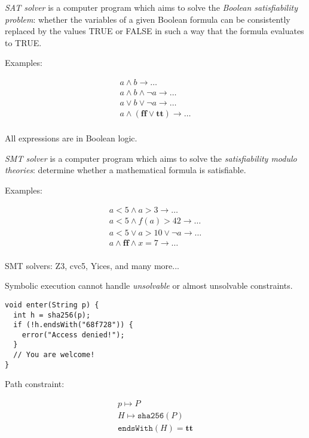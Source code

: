 \documentclass{article}
\begin{document}
\plush{}



\emph{SAT solver} is a computer program which aims to solve the \emph{Boolean satisfiability problem}: whether the variables of a given Boolean formula can be consistently replaced by the values TRUE or FALSE in such a way that the formula evaluates to TRUE.

Examples:

\begin{equation*}
\begin{split}
a \wedge b \to \dots \\
a \wedge b \wedge \neg a \to \dots \\
a \vee b \vee \neg a \to \dots \\
a \wedge ( \textbf{ff} \vee \textbf{tt} ) \to \dots \\
\end{split}
\end{equation*}

All expressions are in Boolean logic.

\plush{}


\emph{SMT solver} is a computer program which aims to solve the \emph{satisfiability modulo theories}: determine whether a mathematical formula is satisfiable.

Examples:

\begin{equation*}
\begin{split}
a < 5 \wedge a > 3 \to \dots \\
a < 5 \wedge f(a) > 42 \to \dots \\
a < 5 \vee a > 10 \vee \neg a \to \dots \\
a \wedge \textbf{ff} \wedge x = 7 \to \dots \\
\end{split}
\end{equation*}

SMT solvers: Z3, cvc5, Yices, and many more...

\plush{}


Symbolic execution cannot handle \emph{unsolvable} or almost unsolvable constraints.

\begin{multicols}{2}
{\small\begin{verbatim}
void enter(String p) {
  int h = sha256(p);
  if (!h.endsWith("68f728")) {
    error("Access denied!");
  }
  // You are welcome!
}
\end{verbatim}
}
\par\columnbreak\par
Path constraint:

\begin{gather*}
p \mapsto P \\
H \mapsto \texttt{sha256}(P) \\
\texttt{endsWith}(H) = \textbf{tt}
\end{gather*}
\end{multicols}
\end{document}
